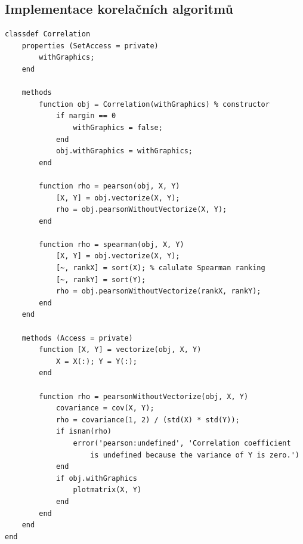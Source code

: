 \newpage
\subsection*{Implementace korelačních algoritmů}
\begin{verbatim}
classdef Correlation
    properties (SetAccess = private)
        withGraphics;
    end

    methods
        function obj = Correlation(withGraphics) % constructor
            if nargin == 0
                withGraphics = false;
            end
            obj.withGraphics = withGraphics;
        end

        function rho = pearson(obj, X, Y)
            [X, Y] = obj.vectorize(X, Y);
            rho = obj.pearsonWithoutVectorize(X, Y);
        end

        function rho = spearman(obj, X, Y)
            [X, Y] = obj.vectorize(X, Y);
            [~, rankX] = sort(X); % calulate Spearman ranking
            [~, rankY] = sort(Y);
            rho = obj.pearsonWithoutVectorize(rankX, rankY);
        end
    end

    methods (Access = private)
        function [X, Y] = vectorize(obj, X, Y)
            X = X(:); Y = Y(:);
        end

        function rho = pearsonWithoutVectorize(obj, X, Y)
            covariance = cov(X, Y);
            rho = covariance(1, 2) / (std(X) * std(Y));
            if isnan(rho)
                error('pearson:undefined', 'Correlation coefficient
                    is undefined because the variance of Y is zero.')
            end
            if obj.withGraphics
                plotmatrix(X, Y)
            end
        end
    end
end

\end{verbatim}

\newpage
